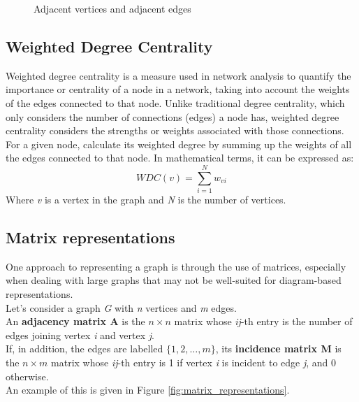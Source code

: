 \begin{figure}[H]
    \centering
    \quad %
    \caption{Adjacent vertices and adjacent edges}
    \label{fig:adiacency}
\end{figure}

\subsection{Weighted Degree Centrality}
\label{subsec:weighted_degree}
Weighted degree centrality is a measure used in network analysis to quantify the importance or centrality of a node in a network, taking into account the weights of the edges connected to that node. 
Unlike traditional degree centrality, which only considers the number of connections (edges) a node has, weighted degree centrality considers the strengths or weights associated with those connections.
For a given node, calculate its weighted degree by summing up the weights of all the edges connected to that node. In mathematical terms, it can be expressed as:
\begin{equation}
  WDC(v) = \sum_{i=1}^{N} w_{vi}
\end{equation}
Where \textit{v} is a vertex in the graph and \textit{N} is the number of vertices.

\subsection{Matrix representations}
One approach to representing a graph is through the use of matrices, especially when dealing with large graphs that may not be well-suited for diagram-based representations.\\
Let's consider a graph \textit{G} with \textit{n} vertices and \textit{m} edges. \\
An \textbf{adjacency matrix A} is the $n \times n$ matrix whose \textit{ij}-th entry is the number of edges joining vertex \textit{i} and vertex \textit{j}. \\
If, in addition, the edges are labelled $\{1, 2, \dots, m\}$, its \textbf{incidence matrix M} is the $n \times m$ matrix whose \textit{ij}-th entry is 1 if vertex \textit{i} is incident to edge \textit{j}, and 0 otherwise. \\
An example of this is given in Figure \ref{fig:matrix_representations}.

